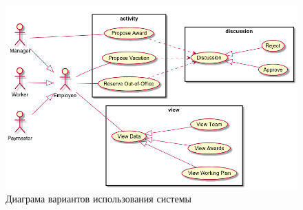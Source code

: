\begin{figure}[H]
    \centering
    \includegraphics[width=\textwidth]{resources/01_analysis/01_use_cases.png}
    \caption{Диаграма вариантов использования системы}
    \label{fig:01-use-case}
\end{figure}

